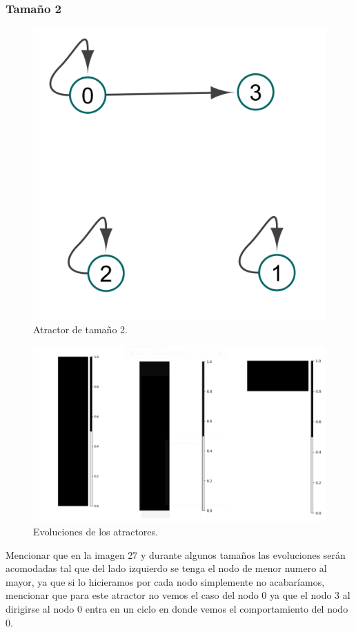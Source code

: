 \documentclass[11pt]{article}
\begin{document}
			\subsubsection{Tamaño 2}
			\begin{figure}[H]
			\centering
			\includegraphics[scale=0.08]{resources/Atractores22/atractor_22_size_2.png}
			\caption{Atractor de tamaño 2.}\label{fig:picture}
			\end{figure}
			\begin{figure}[H]
			\centering
			\includegraphics[scale=0.5]{resources/Atractores22/atractor_22_size_2_res.png}
			\caption{Evoluciones de los atractores.}\label{fig:picture}
			\end{figure}
			Mencionar que en la imagen 27 y durante algunos tamaños las evoluciones serán acomodadas tal que del lado izquierdo se tenga el nodo de menor numero al mayor, ya que si lo hicieramos por cada nodo simplemente no acabaríamos, mencionar que para este atractor no vemos el caso del nodo 0 ya que el nodo 3 al dirigirse al nodo 0 entra en un ciclo en donde vemos el comportamiento del nodo 0.
\end{document}
